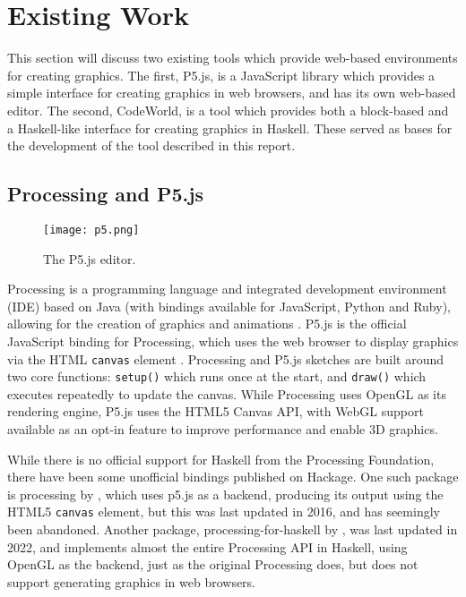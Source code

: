 \documentclass[../main.tex]{subfiles}
\begin{document}
    \section{Existing Work}
        This section will discuss two existing tools which provide web-based
            environments for creating graphics.
        The first, P5.js, is a JavaScript library which provides a simple interface for
            creating graphics in web browsers, and has its own web-based editor.
        The second, CodeWorld, is a tool which provides both a block-based and a
            Haskell-like interface for creating graphics in Haskell.
        These served as bases for the development of the tool described in this report.

        \subsection{Processing and P5.js}
            \begin{figure}[H]
                \centering
                \texttt{[image: p5.png]}
                    \caption{The P5.js editor.}
                    \label{fig:p5}
            \end{figure}

            Processing is a programming language and integrated development environment
                (IDE) based on Java (with bindings available for JavaScript, Python and Ruby),
                allowing for the creation of graphics and animations \citep{processing}.
            P5.js is the official JavaScript binding for Processing, which uses the web
                browser to display graphics via the HTML \texttt{canvas} element \citep{p5js}.
            Processing and P5.js sketches are built around two core functions:
                \texttt{setup()} which runs once at the start, and \texttt{draw()} which
                executes repeatedly to update the canvas.
            While Processing uses OpenGL as its rendering engine, P5.js uses the HTML5
                Canvas API, with WebGL support available as an opt-in feature \citep{p5WebGL}
                to improve performance and enable 3D graphics.

            While there is no official support for Haskell from the Processing Foundation,
                there have been some unofficial bindings published on Hackage.
            One such package is processing by \citet{hackageProcessing}, which uses p5.js
                as a backend, producing its output using the HTML5 \texttt{canvas} element, but
                this was last updated in 2016, and has seemingly been abandoned.
            Another package, processing-for-haskell by \citet{hackageProcessingForHaskell},
                was last updated in 2022, and implements almost the entire Processing API in
                Haskell, using OpenGL as the backend, just as the original Processing does, but
                does not support generating graphics in web browsers.
\end{document}
